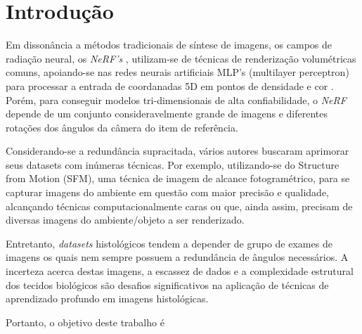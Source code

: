 \section{Introdução}
\label{sec:introducao}

Em dissonância a métodos tradicionais de síntese de imagens, os campos de radiação neural, os \textit{NeRF's} \cite{mildenhall2020nerfrepresentingscenesneural}, utilizam-se de técnicas de renderização volumétricas comuns, apoiando-se nas redes neurais artificiais MLP's (multilayer perceptron) \cite{GARDNER19982627} para processar a entrada de coordanadas 5D em pontos de densidade e cor \cite{mildenhall2020nerfrepresentingscenesneural}. Porém, para conseguir modelos tri-dimensionais de alta confiabilidade, o \textit{NeRF} depende de um conjunto consideravelmente grande de imagens e diferentes rotações dos ângulos da câmera do item de referência.

Considerando-se a redundância supracitada, vários autores buscaram aprimorar seus datasets com inúmeras técnicas. Por exemplo, utilizando-se do Structure from Motion (SFM), uma técnica de imagem de alcance fotogramétrico, para se capturar imagens do ambiente em questão com maior precisão e qualidade, alcançando técnicas computacionalmente caras ou que, ainda assim, precisam de diversas imagens do ambiente/objeto a ser renderizado\cite{kerbl3Dgaussians}.

Entretanto, \textit{datasets} histológicos tendem a depender de grupo de exames de imagens os quais nem sempre possuem a redundância de ângulos necessários. A incerteza acerca destas imagens, a escassez de dados e a complexidade estrutural dos tecidos biológicos são desafios significativos na aplicação de técnicas de aprendizado profundo em imagens histológicas.  

Portanto, o objetivo deste trabalho é